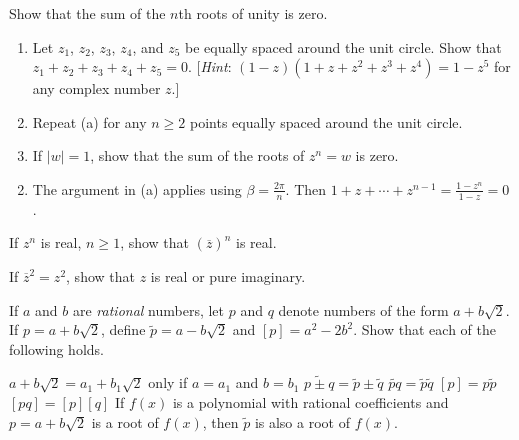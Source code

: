 \begin{multicols}{2}
\begin{ex}
Show that the sum of the $n$th roots of unity is zero. \newline [\textit{Hint:} $1 - z^{n} = (1 - z)(1 + z + z^{2} + \dots  + z^{n-1})$ for any complex number $z$.]
\end{ex}

\begin{ex}
\begin{enumerate}[label={\alph*.}]
\item Let $z_{1}$, $z_{2}$, $z_{3}$, $z_{4}$, and $z_{5}$ be equally spaced around the unit circle. Show that $z_{1} + z_{2} + z_{3} + z_{4} + z_{5} = 0$. [\textit{Hint}: $(1 - z)(1 + z + z^{2} + z^{3} + z^{4}) = 1 - z^{5}$ for any complex number $z$.]

\item Repeat (a) for any $n \geq 2$ points equally spaced around the unit circle.

\item If $|w| = 1$, show that the sum of the roots of $z^n = w$ is zero.

\end{enumerate}
\begin{sol}
\begin{enumerate}[label={\alph*.}]
\setcounter{enumi}{1}
\item  The argument in (a) applies using $\beta = \frac{2\pi}{n}$.
 Then $ 1 + z + \cdots + z^{n-1} = \frac{1-z^n}{1-z}=0$.


\end{enumerate}
\end{sol}
\end{ex}

\begin{ex}
If $z^n$ is real, $n \geq 1$, show that $(\overline{z})^{n}$ is real.
\end{ex}

\begin{ex}
If $\overline{z}^2 = z^{2}$, show that $z$ is real or pure imaginary.
\end{ex}

\begin{ex}
If $a$ and $b$ are \textit{rational} numbers, let $p$ and $q$ denote numbers of the form $a + b\sqrt{2}$. If $p = a + b\sqrt{2}$, define $\tilde{p} = a-b\sqrt{2}$ and $[p] = a^{2} - 2b^{2}$. Show that each of the following holds.

\begin{exenumerate}
\exitem* $a + b\sqrt{2} = a_{1} + b_{1}\sqrt{2}$ only if $a = a_{1}$ and $b = b_{1}$
\exitem $\widetilde{p \pm q} = \tilde{p} \pm \tilde{q}$
\exitem $\widetilde{pq} = \tilde{p}\tilde{q}$
\exitem $[p] = p \tilde{p}$
\exitem $[pq] = [p][q]$
\exitem* If $f(x)$ is a polynomial with rational coefficients and $p = a + b\sqrt{2}$ is a root of $f(x)$, then $\tilde{p}$
 is also a root of $f(x)$.
\end{exenumerate}
\end{ex}

\end{multicols}

